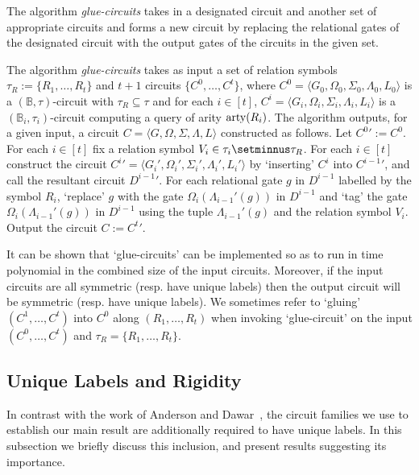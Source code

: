 \documentclass[../paper.tex]{subfiles}
\begin{document}
The algorithm \emph{glue-circuits} takes in a designated circuit and another set
of appropriate circuits and forms a new circuit by replacing the relational
gates of the designated circuit with the output gates of the circuits in the
given set.

\begin{definition}
  The algorithm \emph{glue-circuits} takes as input a set of relation symbols
  $\tau_R := \{R_1, \ldots, R_t\}$ and $t+1$ circuits $\{C^0, \ldots, C^{t}\}$,
  where $C^0 = \langle G_0, \Omega_0, \Sigma_0, \Lambda_0, L_0 \rangle$ is a
  $(\mathbb{B}, \tau)$-circuit with $\tau_R \subseteq \tau$ and for each $i \in
  [t]$, $C^i = \langle G_i, \Omega_i, \Sigma_i, \Lambda_i, L_i \rangle$ is a
  $(\mathbb{B}_i, \tau_i)$-circuit computing a query of arity $\mathrm{arty}(R_i)$. The
  algorithm outputs, for a given input, a circuit $C = \langle G, \Omega,
  \Sigma, \Lambda, L\rangle$ constructed as follows. Let $C^0' := C^0$. For each
  $i \in [t]$ fix a relation symbol $V_i \in \tau_i \setminnus \tau_R$. For each
  $i \in [t]$ construct the circuit $C^{i}' = \langle G_i', \Omega_i',
  \Sigma_i', \Lambda_i', L_i' \rangle $ by `inserting' $C^i$ into $C^{i-1}'$,
  and call the resultant circuit $D^{i-1}'$. For each relational gate $g$ in
  $D^{i-1}$ labelled by the symbol $R_i$, `replace' $g$ with the gate
  $\Omega_{i}(\Lambda_{i-1}'(g))$ in $D^{i-1}$ and `tag' the gate
  $\Omega_i(\Lambda_{i-1}'(g))$ in $D^{i-1}$ using the tuple $\Lambda_{i-1}'(g)$
  and the relation symbol $V_i$. Output the circuit $C := C^t'$.
\end{definition}

It can be shown that `glue-circuits' can be implemented so as to run in time
polynomial in the combined size of the input circuits. Moreover, if the input
circuits are all symmetric (resp. have unique labels) then the output circuit
will be symmetric (resp. have unique labels). We sometimes refer to `gluing'
$(C^1, \ldots, C^t)$ into $C^0$ along $(R_1 , \ldots , R_t)$ when invoking
`glue-circuit' on the input $(C^0, \ldots , C^t)$ and $\tau_R = \{R_1, \ldots ,
R_t\}$.

\subsection{Unique Labels and Rigidity}
In contrast with the work of Anderson and Dawar~\cite{}, the circuit families we
use to establish our main result are additionally required to have unique
labels. In this subsection we briefly discuss this inclusion, and present
results suggesting its importance.
\end{document}
